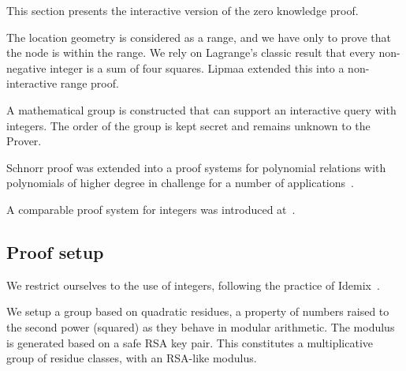 \documentclass{article}
\begin{document}
This section presents the interactive version of the zero knowledge proof. 

The location geometry is considered as a range, and we have only to prove that the node is within the range. 
We rely on Lagrange's classic result that every non-negative integer is a sum of four squares. 
Lipmaa extended this into a non-interactive range proof. 

A mathematical group is constructed that can support an interactive query with integers. 
The order of the group is kept secret and remains unknown to the Prover.

Schnorr proof was extended into a proof systems for polynomial relations
with polynomials of higher degree in challenge
for a number of applications~\cite{F363,CF12}.

A comparable proof system for integers was introduced at~\cite{F10}.

\subsection{Proof setup}

We restrict ourselves to the use of integers, following the practice of Idemix~\cite{Idemix}.

We setup a group based on quadratic residues, a property of numbers raised to the second power (squared) as they behave in modular arithmetic. The modulus is generated based on a safe RSA key pair. This constitutes a multiplicative group of residue classes, with an RSA-like modulus.
\end{document}
